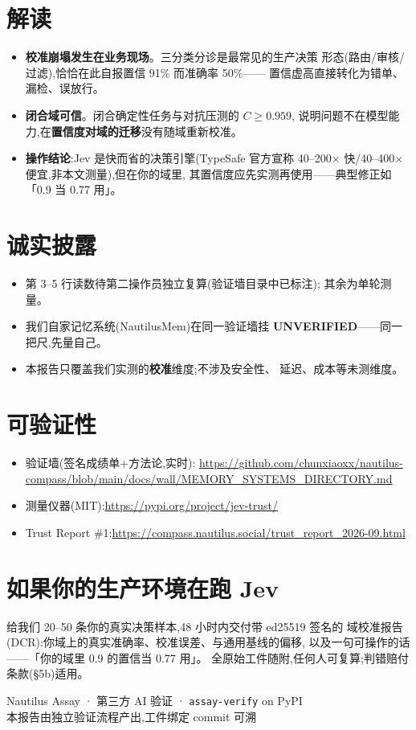 \documentclass[11pt]{article}
\begin{document}
\section{解读}
\begin{itemize}
\item \textbf{校准崩塌发生在业务现场}。三分类分诊是最常见的生产决策
形态(路由/审核/过滤),恰恰在此自报置信 91\% 而准确率 50\%——
置信虚高直接转化为错单、漏检、误放行。
\item \textbf{闭合域可信}。闭合确定性任务与对抗压测的 $C \ge 0.959$,
说明问题不在模型能力,在\textbf{置信度对域的迁移}没有随域重新校准。
\item \textbf{操作结论}:Jev 是快而省的决策引擎(TypeSafe 官方宣称
40--200$\times$ 快/40--400$\times$ 便宜,非本文测量),但在你的域里,
其置信度应先实测再使用——典型修正如「0.9 当 0.77 用」。
\end{itemize}

\section{诚实披露}
\begin{itemize}
\item 第 3--5 行读数待第二操作员独立复算(验证墙目录中已标注);
其余为单轮测量。
\item 我们自家记忆系统(NautilusMem)在同一验证墙挂
\textbf{UNVERIFIED}——同一把尺,先量自己。
\item 本报告只覆盖我们实测的\textbf{校准}维度;不涉及安全性、
延迟、成本等未测维度。
\end{itemize}

\section{可验证性}
\begin{itemize}
\item 验证墙(签名成绩单+方法论,实时):
\url{https://github.com/chunxiaoxx/nautilus-compass/blob/main/docs/wall/MEMORY_SYSTEMS_DIRECTORY.md}
\item 测量仪器(MIT):\url{https://pypi.org/project/jev-trust/}
\item Trust Report \#1:\url{https://compass.nautilus.social/trust_report_2026-09.html}
\end{itemize}

\section*{如果你的生产环境在跑 Jev}
给我们 20--50 条你的真实决策样本,48 小时内交付带 ed25519 签名的
域校准报告(DCR):你域上的真实准确率、校准误差、与通用基线的偏移,
以及一句可操作的话——「你的域里 0.9 的置信当 0.77 用」。
全原始工件随附,任何人可复算;判错赔付条款(§5b)适用。

\vfill
\begin{center}\footnotesize
Nautilus Assay · 第三方 AI 验证 · \texttt{assay-verify} on PyPI\\
本报告由独立验证流程产出,工件绑定 commit 可溯
\end{center}
\end{document}

